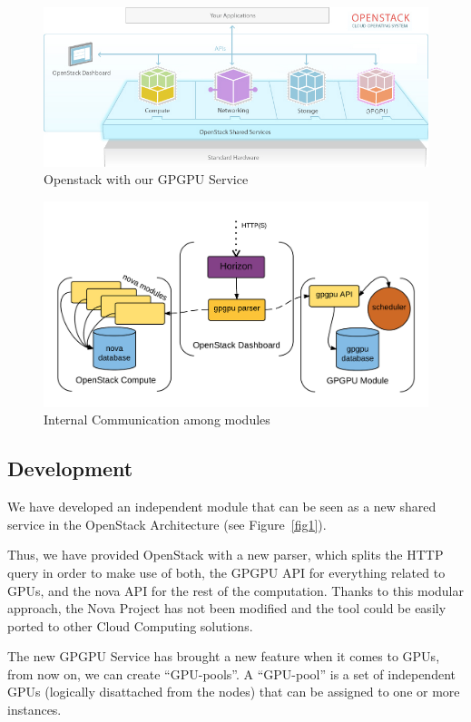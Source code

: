 \documentclass[a4paper,twoside]{article}
\begin{document}
\begin{figure}[!t]
  \centering
  \includegraphics[width=\linewidth]{images/os1.jpg}
  \caption{Openstack with our GPGPU Service}
  \label{fig:external}
\end{figure}

\begin{figure}[!t]
  \centering
  \includegraphics[width=.9\linewidth]{images/os2.png}
  \caption{Internal Communication among modules}
  \label{fig:internal}
\end{figure}

\subsection{Development}
We have developed an independent module that can be seen as a new shared service in the OpenStack Architecture (see Figure~\ref{fig1}).

Thus, we have provided OpenStack with a new parser, which splits the HTTP query in order to make use of both, the GPGPU API for everything related to GPUs, and the nova API for the rest of the computation. 
Thanks to this modular approach, the Nova Project has not been modified and the tool could be easily ported to other Cloud Computing solutions.

The new GPGPU Service has brought a new feature when it comes to GPUs, from now on, we can create ``GPU-pools''. A ``GPU-pool'' is a set of independent GPUs (logically disattached from the nodes) that can be assigned to one or more instances.
\end{document}
